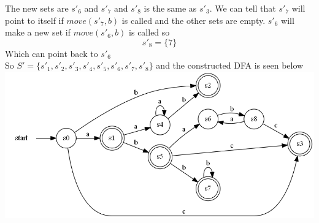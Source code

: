 \documentclass[12pt]{article}
\begin{document}
The new sets are $s'_{6}$ and $s'_{7}$ and $s'_8$ is the same as $s'_3$. We can tell that $s'_{7}$ will point to itself if $move(s'_{7},b)$ is called and the other sets are empty. $s'_{6}$ will make a new set if $move(s'_{6},b)$ is called so
$$s'_{8}=\{7\}$$
Which can point back to $s'_6$\\
So $S'=\{s'_1,s'_2,s'_3,s'_4,s'_5,s'_{6},s'_{7},s'_{8}\}$ and the constructed DFA is seen below\\
\includegraphics[scale=0.5]{graph6}
\end{document}

